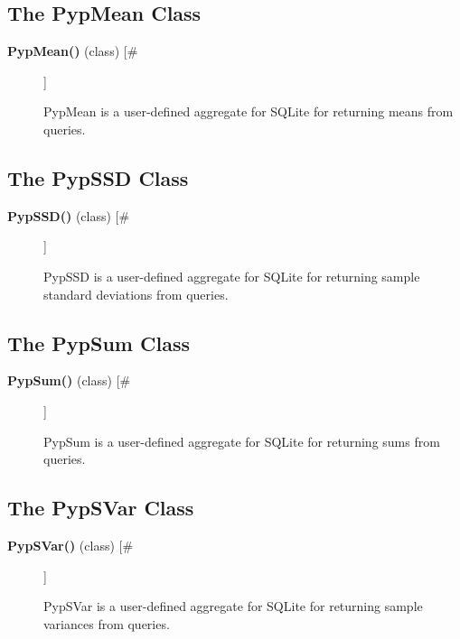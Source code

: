 \subsection*{The PypMean Class}
\begin{description}
\item[\textbf{PypMean()}
 (class) [\#]]

 PypMean is a user-defined aggregate for SQLite for returning means from queries.


\end{description}
\subsection*{The PypSSD Class}
\begin{description}
\item[\textbf{PypSSD()}
 (class) [\#]]

 PypSSD is a user-defined aggregate for SQLite for returning sample standard deviations from queries.


\end{description}
\subsection*{The PypSum Class}
\begin{description}
\item[\textbf{PypSum()}
 (class) [\#]]

 PypSum is a user-defined aggregate for SQLite for returning sums from queries.


\end{description}
\subsection*{The PypSVar Class}
\begin{description}
\item[\textbf{PypSVar()}
 (class) [\#]]

 PypSVar is a user-defined aggregate for SQLite for returning sample variances from queries.


\end{description}

